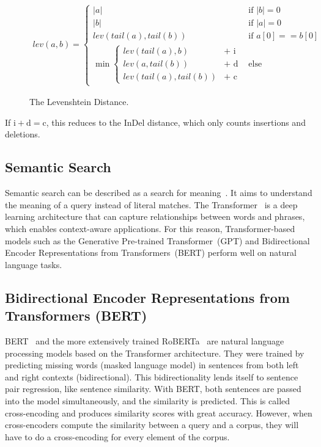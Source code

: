 \documentclass[
     12pt,                    %
     a4paper,             %
     BCOR=10mm,     %
     DIV=14,                 %
     listof=totoc,                    %
     bibliography=totoc,       %
     index=totoc,              %
     twoside,
     headsepline
     ]{scrreprt}
\begin{document}
\begin{figure}[htb]
	\centering
\begin{align*}
	lev(a, b) =
	\begin{cases}
		|a| & \text{if } |b| = 0\\
		|b| & \text{if } |a| = 0\\
		lev(tail(a), tail(b)) & \text{if } a[0] == b[0]\\
		\min
		\begin{cases}
			lev(tail(a), b) &+ \text{ i}\\
			lev(a, tail(b)) &+ \text{ d}\\
			lev(tail(a), tail(b)) &+ \text{ c}
		\end{cases} & \text{else}
	\end{cases}
\end{align*}
\caption[The Levenshtein Distance]{The Levenshtein Distance.}
\end{figure}


If \(\text{i} + \text{d} = \text{c}\), this reduces to the InDel distance, which only counts insertions and deletions.

\subsection{Semantic Search}\label{semantic}

Semantic search can be described as a search for meaning~\cite{bast2016semantic}. It aims to understand the meaning of a query instead of literal matches. The Transformer~\cite{vaswani2017attention} is a deep learning architecture that can capture relationships between words and phrases, which enables context-aware applications. For this reason, Transformer-based models such as the Generative Pre-trained Transformer~(GPT) and Bidirectional Encoder Representations from Transformers~(BERT) perform well on natural language tasks.


\subsection{Bidirectional Encoder Representations from Transformers (BERT)}

BERT~\cite{feng2020codebert} and the more extensively trained RoBERTa~\cite{liu2019roberta} are natural language processing models based on the Transformer architecture. They were trained by predicting missing words (masked language model) in sentences from both left and right contexts (bidirectional). This bidirectionality lends itself to sentence pair regression, like sentence similarity.
With BERT, both sentences are passed into the model simultaneously, and the similarity is predicted. This is called cross-encoding and produces similarity scores with great accuracy. However, when cross-encoders compute the similarity between a query and a corpus, they will have to do a cross-encoding for every element of the corpus.
\end{document}

